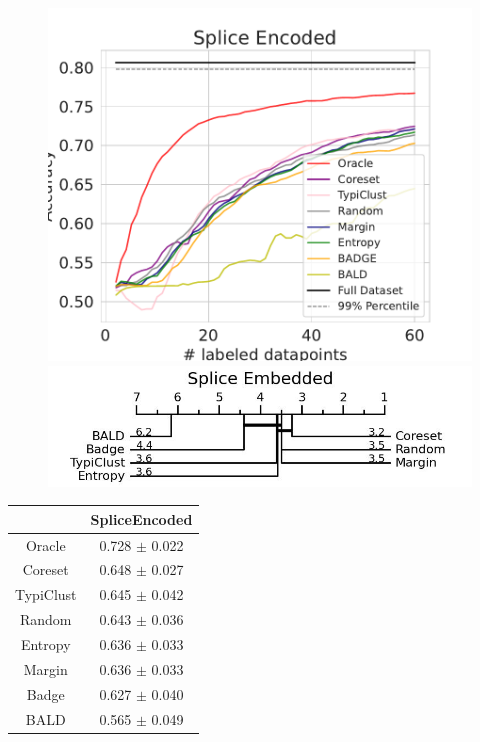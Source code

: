 \documentclass[]{article}
\begin{document}
\begin{minipage}{0.65\linewidth}
\begin{figure}[H]
    \centering
    \includegraphics[width=\linewidth]{img/eval_splice_enc} \\ [2mm]
    \includegraphics[width=\linewidth]{img/micro_splice_enc.jpg}
\end{figure}
\end{minipage}
\begin{minipage}{0.29\linewidth}
\begin{tabular}{c|c}
&SpliceEncoded \\
\hline
Oracle&0.728 $\pm$ 0.022\\
Coreset&0.648 $\pm$ 0.027\\
TypiClust&0.645 $\pm$ 0.042\\
Random&0.643 $\pm$ 0.036\\
Entropy&0.636 $\pm$ 0.033\\
Margin&0.636 $\pm$ 0.033\\
Badge&0.627 $\pm$ 0.040\\
BALD&0.565 $\pm$ 0.049\\
\end{tabular}
\end{minipage}
\end{document}

